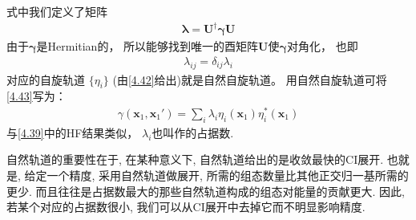 式中我们定义了矩阵
\begin{align}
\bm{\lambda} = \mathbf{U^\dagger}\bm{\gamma}\mathbf{U}
\end{align}
由于$\bm{\gamma}$是Hermitian的，
所以能够找到唯一的酉矩阵$\mathbf{U}$使$\bm{\gamma}$对角化，
也即
\begin{align}
\lambda_{ij} = \delta_{ij}\lambda_i
\end{align}
对应的自旋轨道 $\{\eta_i\}$ (由\autoref{4.42}给出)就是自然自旋轨道。
用自然自旋轨道可将\autoref{4.43}写为：
\begin{align}
\gamma(\mathbf{x}_1,\mathbf{x}_1') = \sum_i \lambda_i \eta_i(\mathbf{x}_1) \eta_i^*(\mathbf{x}_1)
\end{align}
与\autoref{4.39}中的HF结果类似，
$\lambda_i$也叫作的占据数.


自然轨道的重要性在于, 
在某种意义下, 
自然轨道给出的是收敛最快的CI展开. 
也就是, 
给定一个精度, 
采用自然轨道做展开, 
所需的组态数量比其他正交归一基所需的更少. 
而且往往是占据数最大的那些自然轨道构成的组态对能量的贡献更大. 
因此, 
若某个对应的占据数很小, 
我们可以从CI展开中去掉它而不明显影响精度.


